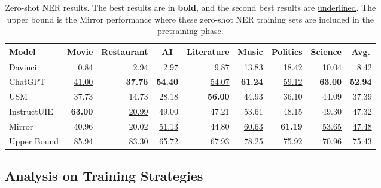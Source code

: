 \begin{table*}[t]
    \centering
    \begin{tabular}{lrrrrrrrr}
        \toprule
    Model &
      \multicolumn{1}{c}{Movie} &
      \multicolumn{1}{c}{Restaurant} &
      \multicolumn{1}{c}{AI} &
      \multicolumn{1}{c}{Literature} &
      \multicolumn{1}{c}{Music} &
      \multicolumn{1}{c}{Politics} &
      \multicolumn{1}{c}{Science} &
      \multicolumn{1}{c}{Avg.} \\
      \midrule
    Davinci          & 0.84           & 2.94           & 2.97           & 9.87           & 13.83          & 18.42          & 10.04          & 8.42           \\
    ChatGPT          & \underline{ 41.00}    & \textbf{37.76} & \textbf{54.40} & \underline{ 54.07}    & \textbf{61.24} & \underline{ 59.12}    & \textbf{63.00} & \textbf{52.94} \\
    USM              & 37.73          & 14.73          & 28.18          & \textbf{56.00} & 44.93          & 36.10          & 44.09          & 37.39          \\
    InstructUIE      & \textbf{63.00} & \underline{ 20.99}    & 49.00          & 47.21          & 53.61          & 48.15          & 49.30          & 47.32          \\
    Mirror & 40.96          & 20.02          & \underline{ 51.13}    & 44.80          & \underline{ 60.63}    & \textbf{61.19} & \underline{ 53.65}    & \underline{ 47.48}    \\
    \midrule
    Upper Bound      & 85.94          & 83.30          & 65.72          & 67.93          & 78.25          & 75.92          & 70.96          & 75.43 \\
    \bottomrule
    \end{tabular}%
    \caption{
        Zero-shot NER results.
        The best results are in \textbf{bold}, and the second best results are \underline{underlined}.
        The upper bound is the Mirror performance where these zero-shot NER training sets are included in the pretraining phase.
    }
    \label{tab:zero_shot_ner}
\end{table*}


\subsection{Analysis on Training Strategies}

